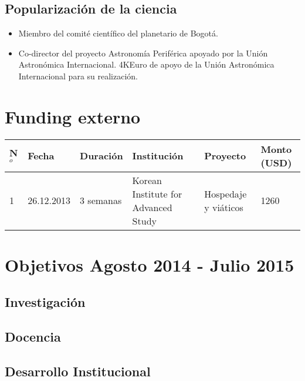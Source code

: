 \documentclass{article}
\begin{document}
\subsection*{Popularizaci\'on de la ciencia}
\begin{itemize}
\item {Miembro del comit\'e cient\'ifico del planetario de Bogot\'a.}
\item {Co-director del proyecto Astronom\'ia Perif\'erica apoyado por
  la Uni\'on Astron\'omica Internacional. 4KEuro de apoyo de la Uni\'on Astron\'omica Internacional para su realizaci\'on.} 
\end{itemize}


\section*{Funding externo}
\begin{tabular}{lp{1.8cm} p{2.0cm} p{3.5cm} p{2.3cm} p{2.3cm}}\hline
N$^{o}$ & Fecha & Duraci\'on & Instituci\'on & Proyecto & Monto (USD)\\\hline
1 & 26.12.2013 & 3 semanas & Korean Institute for Advanced Study & Hospedaje y vi\'aticos & 1260\\\hline
\end{tabular}

\section*{Objetivos Agosto 2014 - Julio 2015}
\subsection*{Investigaci\'on}

\subsection*{Docencia}

\subsection*{Desarrollo Institucional}
\end{document}
